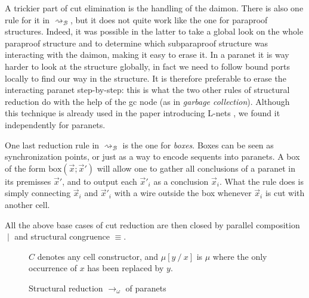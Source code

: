 \documentclass[12pt]{report}
\renewcommand{\setminus}{\mathbin{\backslash}}
\newcommand{\dai}{✠}
\newcommand{\subst}[3]{#1\left[#2 \mathbin{/} #3\right]}
\newcommand{\cutred}{\rightsquigarrow}
\begin{document}
A trickier part of cut elimination is the handling of the daimon. There is also one rule for it in
$\cutred_{\mathcal{B}}$, but it does not quite work like the one for paraproof structures. Indeed,
it was possible in the latter to take a global look on the whole paraproof structure and to
determine which subparaproof structure was interacting with the daimon, making it easy to erase it.
In a paranet it is way harder to look at the structure globally, in fact we need to follow bound
ports locally to find our way in the structure. It is therefore preferable to erase the interacting
paranet step-by-step: this is what the two other rules of structural reduction do with the help of
the gc node (as in \emph{garbage collection}). Although this technique is already used in the paper
introducing L-nets \cite{FM05}, we found it independently for paranets.

One last reduction rule in $\cutred_{\mathcal{B}}$ is the one for \emph{boxes}. Boxes can be seen as
synchronization points, or just as a way to encode sequents into paranets. A box of the form
$\mathrm{box}(\vec{x};\vec{x}')$ will allow one to gather all conclusions of a paranet in its
premisses $\vec{x}'$, and to output each $\vec{x}'_i$ as a conclusion $\vec{x}_i$. What the rule
does is simply connecting $\vec{x}_i$ and $\vec{x}'_i$ with a wire outside the box whenever
$\vec{x}_i$ is cut with another cell.

All the above base cases of cut reduction are then closed by parallel composition $∣$ and structural
congruence $\equiv$.

\begin{figure}[h]
    $C$ denotes any cell constructor, and $\subst{\mu}{y}{x}$ is $\mu$ where the only occurrence of $x$
    has been replaced by $y$.
    \caption[]{Structural reduction $\rightarrow_\omega$ of paranets}
    \label{def:structred-lnets}
\end{figure}
\end{document}
